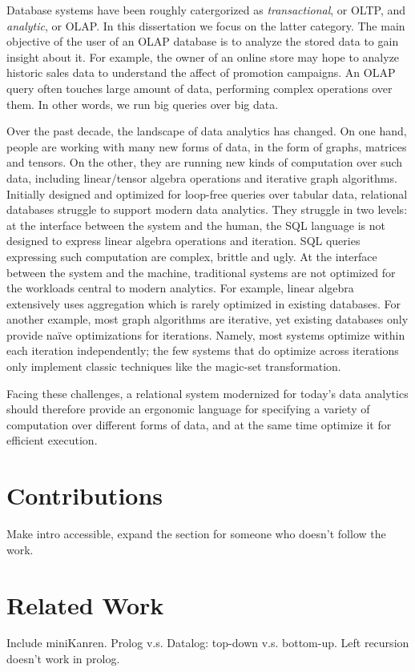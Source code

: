 Database systems have been roughly catergorized as {\em transactional},
 or OLTP, and {\em analytic}, or OLAP.
In this dissertation we focus on the latter category.
The main objective of the user of an OLAP database 
 is to analyze the stored data to gain insight about it.
For example, the owner of an online store may hope to 
 analyze historic sales data to understand 
 the affect of promotion campaigns.
An OLAP query often touches large amount of data,
 performing complex operations over them.
In other words, we run big queries over big data. 

Over the past decade, the landscape of data analytics has changed.
On one hand, people are working with many new forms of data, 
 in the form of graphs, matrices and tensors.
On the other, they are running new kinds of computation 
 over such data, including linear/tensor algebra operations 
 and iterative graph algorithms.
Initially designed and optimized for loop-free queries over tabular data,
 relational databases struggle to support modern data analytics. 
They struggle in two levels: 
 at the interface between the system and the human,  
 the SQL language is not designed to express linear algebra operations 
 and iteration. 
SQL queries expressing such computation are complex,
 brittle and ugly.
At the interface between the system and the machine,
 traditional systems are not optimized for the workloads 
 central to modern analytics.
For example, linear algebra extensively uses aggregation 
 which is rarely optimized in existing databases.
For another example, most graph algorithms are iterative,
 yet existing databases only provide na\"ive optimizations for iterations. 
Namely, most systems optimize within each iteration independently;
 the few systems that do optimize across iterations 
 only implement classic techniques like the magic-set transformation. 

Facing these challenges, a relational system modernized 
 for today's data analytics 
 should therefore provide an ergonomic language 
 for specifying a variety of computation 
 over different forms of data,
 and at the same time optimize it for efficient execution. 

\section{Contributions}
\label{sec:intro:contributions}

Make intro accessible, expand the section for someone who doesn't follow 
 the work. 

\section{Related Work}
\label{sec:intro:related-work}

Include miniKanren. Prolog v.s. Datalog: top-down v.s.
bottom-up. Left recursion doesn't work in prolog. 

